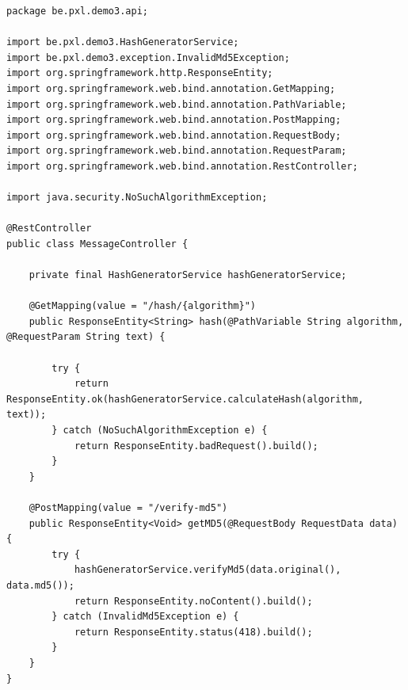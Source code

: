 \begin{lstlisting}
package be.pxl.demo3.api;

import be.pxl.demo3.HashGeneratorService;
import be.pxl.demo3.exception.InvalidMd5Exception;
import org.springframework.http.ResponseEntity;
import org.springframework.web.bind.annotation.GetMapping;
import org.springframework.web.bind.annotation.PathVariable;
import org.springframework.web.bind.annotation.PostMapping;
import org.springframework.web.bind.annotation.RequestBody;
import org.springframework.web.bind.annotation.RequestParam;
import org.springframework.web.bind.annotation.RestController;

import java.security.NoSuchAlgorithmException;

@RestController
public class MessageController {

	private final HashGeneratorService hashGeneratorService;

	@GetMapping(value = "/hash/{algorithm}")
	public ResponseEntity<String> hash(@PathVariable String algorithm, @RequestParam String text) {

		try {
			return ResponseEntity.ok(hashGeneratorService.calculateHash(algorithm, text));
		} catch (NoSuchAlgorithmException e) {
			return ResponseEntity.badRequest().build();
		}
	}

	@PostMapping(value = "/verify-md5")
	public ResponseEntity<Void> getMD5(@RequestBody RequestData data) {
		try {
			hashGeneratorService.verifyMd5(data.original(), data.md5());
			return ResponseEntity.noContent().build();
		} catch (InvalidMd5Exception e) {
			return ResponseEntity.status(418).build();
		}
	}
}
\end{lstlisting}